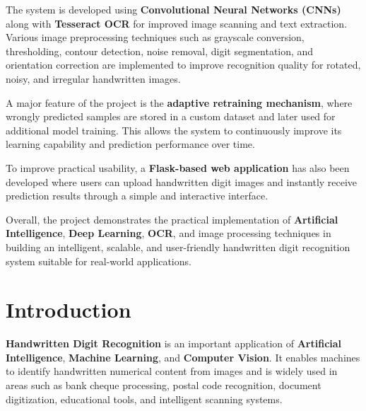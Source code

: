 \documentclass[12pt,a4paper]{article}
\begin{document}
\vspace{0.4cm}

\noindent
The system is developed using \textbf{Convolutional Neural Networks (CNNs)} along with \textbf{Tesseract OCR} for improved image scanning and text extraction. Various image preprocessing techniques such as grayscale conversion, thresholding, contour detection, noise removal, digit segmentation, and orientation correction are implemented to improve recognition quality for rotated, noisy, and irregular handwritten images.

\vspace{0.4cm}

\noindent
A major feature of the project is the \textbf{adaptive retraining mechanism}, where wrongly predicted samples are stored in a custom dataset and later used for additional model training. This allows the system to continuously improve its learning capability and prediction performance over time.

\vspace{0.4cm}

\noindent
To improve practical usability, a \textbf{Flask-based web application} has also been developed where users can upload handwritten digit images and instantly receive prediction results through a simple and interactive interface.

\vspace{0.4cm}

\noindent
Overall, the project demonstrates the practical implementation of \textbf{Artificial Intelligence}, \textbf{Deep Learning}, \textbf{OCR}, and image processing techniques in building an intelligent, scalable, and user-friendly handwritten digit recognition system suitable for real-world applications.

\newpage

\section{Introduction}

\vspace{0.3cm}

\noindent
\textbf{Handwritten Digit Recognition} is an important application of \textbf{Artificial Intelligence}, \textbf{Machine Learning}, and \textbf{Computer Vision}. It enables machines to identify handwritten numerical content from images and is widely used in areas such as bank cheque processing, postal code recognition, document digitization, educational tools, and intelligent scanning systems.
\end{document}
